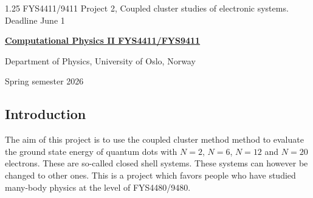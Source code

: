 \documentclass[%
oneside,                 %
final,                   %
10pt]{article}
\begin{document}

\newcommand{\exercisesection}[1]{\subsection*{#1}}






\thispagestyle{empty}

\begin{center}
{\LARGE\bf
\begin{spacing}{1.25}
FYS4411/9411 Project 2, Coupled cluster studies of electronic systems. Deadline June 1
\end{spacing}
}
\end{center}


\begin{center}
{\bf \href{{http://www.uio.no/studier/emner/matnat/fys/FYS4411/index-eng.html}}{Computational Physics II FYS4411/FYS9411}}
\end{center}

    \begin{center}
\centerline{{\small Department of Physics, University of Oslo, Norway}}
\end{center}
    

\begin{center}
Spring semester 2026
\end{center}

\vspace{1cm}


\subsection*{Introduction}

The aim of this project is to use the coupled cluster method
method to evaluate 
the ground state energy of 
quantum dots with $N=2$, $N=6$, $N=12$ and $N=20$ electrons. These are so-called closed shell systems.
These systems can however be changed to other ones. This is a project which favors people who have studied many-body physics at the level of FYS4480/9480.
\end{document}
